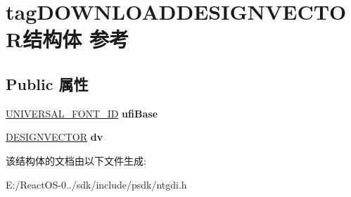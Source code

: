 \hypertarget{structtag_d_o_w_n_l_o_a_d_d_e_s_i_g_n_v_e_c_t_o_r}{}\section{tag\+D\+O\+W\+N\+L\+O\+A\+D\+D\+E\+S\+I\+G\+N\+V\+E\+C\+T\+O\+R结构体 参考}
\label{structtag_d_o_w_n_l_o_a_d_d_e_s_i_g_n_v_e_c_t_o_r}
\subsection*{Public 属性}
\begin{DoxyCompactItemize}
\item 
\mbox{\label{structtag_d_o_w_n_l_o_a_d_d_e_s_i_g_n_v_e_c_t_o_r_a1df73b5f9650f71fd9a733f6ad776b12}} 
\hyperlink{struct___u_n_i_v_e_r_s_a_l___f_o_n_t___i_d}{U\+N\+I\+V\+E\+R\+S\+A\+L\+\_\+\+F\+O\+N\+T\+\_\+\+ID} {\bfseries ufi\+Base}
\item 
\mbox{\label{structtag_d_o_w_n_l_o_a_d_d_e_s_i_g_n_v_e_c_t_o_r_aa51ed235bb4432139671311ea18f0d38}} 
\hyperlink{struct___d_e_s_i_g_n_v_e_c_t_o_r}{D\+E\+S\+I\+G\+N\+V\+E\+C\+T\+OR} {\bfseries dv}
\end{DoxyCompactItemize}


该结构体的文档由以下文件生成\+:\begin{DoxyCompactItemize}
\item 
E\+:/\+React\+O\+S-\/0../sdk/include/psdk/ntgdi.\+h\end{DoxyCompactItemize}
